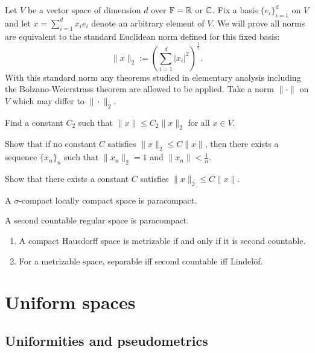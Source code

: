 \documentclass{../../large}
\begin{document}
\begin{prb}
Let $V$ be a vector space of dimension $d$ over $\mathbb{F}=\mathbb{R}$ or $\mathbb{C}$.
Fix a basis $\{e_i\}_{i=1}^d$ on $V$ and let $x=\sum_{i=1}^dx_ie_i$ denote an arbitrary element of $V$.
We will prove all norms are equivalent to the standard Euclidean norm defined for this fixed basis:
\[\|x\|_2:=(\sum_{i=1}^d|x_i|^2)^{\frac12}.\]
With this standard norm any theorems studied in elementary analysis including the Bolzano-Weierstrass theorem are allowed to be applied.
Take a norm $\|\cdot\|$ on $V$ which may differ to $\|\cdot\|_2$.
\begin{parts}
\item Find a constant $C_2$ such that $\|x\|\le C_2\|x\|_2$ for all $x\in V$.
\item Show that if no constant $C$ satisfies $\|x\|_2\le C\|x\|$, then there exists a sequence $\{x_n\}_n$ such that $\|x_n\|_2=1$ and $\|x_n\|<\tfrac1n$.
\item Show that there exists a constant $C$ satisfies $\|x\|_2\le C\|x\|$.
\end{parts}
\end{prb}


\begin{prb}
\begin{parts}
\item A $\sigma$-compact locally compact space is paracompact.
\item A second countable regular space is paracompact.
\end{parts}
\end{prb}

\begin{enumerate}
\item A compact Hausdorff space is metrizable if and only if it is second countable.
\item For a metrizable space, separable iff second countable iff Lindel\"of.
\end{enumerate}




\chapter{Uniform spaces}

\section{Uniformities and pseudometrics}
\end{document}
